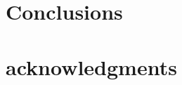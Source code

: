\documentclass[usenatbib, letters]{mnras}
\begin{document}




\section{Conclusions}\label{sect:concl} 

\section*{acknowledgments}


%




\end{document}
